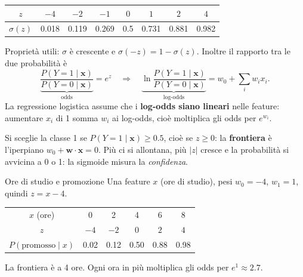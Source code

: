 \documentclass[12pt]{extarticle}
\begin{document}
\begin{center}
\end{center}

\begin{center}
\small
\begin{tabular}{c|ccccccc}
    \toprule
    $z$ & $-4$ & $-2$ & $-1$ & $0$ & $1$ & $2$ & $4$ \\
    \midrule
    $\sigma(z)$ & 0.018 & 0.119 & 0.269 & 0.5 & 0.731 & 0.881 & 0.982 \\
    \bottomrule
\end{tabular}
\end{center}

\noindent Proprietà utili: $\sigma$ è crescente e $\sigma(-z)=1-\sigma(z)$. Inoltre il rapporto tra le due probabilità è
\[
\underbrace{\frac{P(Y{=}1\mid\mathbf{x})}{P(Y{=}0\mid\mathbf{x})}}_{\text{odds}}=e^{z}
\quad\Longrightarrow\quad
\underbrace{\ln\frac{P(Y{=}1\mid\mathbf{x})}{P(Y{=}0\mid\mathbf{x})}}_{\text{log-odds}}=w_0+\sum_i w_i x_i .
\]
La regressione logistica assume che i \textbf{log-odds siano lineari} nelle feature: aumentare $x_i$ di 1 somma $w_i$ ai log-odds, cioè moltiplica gli odds per $e^{w_i}$.

\noindent Si sceglie la classe 1 se $P(Y{=}1\mid\mathbf{x})\ge0.5$, cioè se $z\ge0$: la \textbf{frontiera} è l'iperpiano $w_0+\mathbf{w}\cdot\mathbf{x}=0$. Più ci si allontana, più $|z|$ cresce e la probabilità si avvicina a 0 o 1: la sigmoide misura la \emph{confidenza}.

\begin{esempiobox}{Ore di studio e promozione}
Una feature $x$ (ore di studio), pesi $w_0=-4$, $w_1=1$, quindi $z=x-4$.
\begin{center}
\small
\begin{tabular}{c|ccccc}
    \toprule
    $x$ (ore) & 0 & 2 & 4 & 6 & 8 \\
    $z$ & $-4$ & $-2$ & $0$ & $2$ & $4$ \\
    $P(\text{promosso}\mid x)$ & 0.02 & 0.12 & 0.50 & 0.88 & 0.98 \\
    \bottomrule
\end{tabular}
\end{center}
La frontiera è a 4 ore. Ogni ora in più moltiplica gli odds per $e^1\approx2.7$.
\end{esempiobox}
\end{document}
